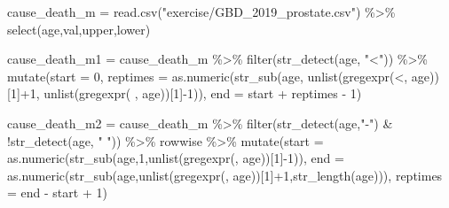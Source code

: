 \documentclass[
  letterpaper,
  DIV=11,
  numbers=noendperiod]{scrartcl}
\newenvironment{Shaded}{\begin{snugshade}}{\end{snugshade}}
\newcommand{\AttributeTok}[1]{\textcolor[rgb]{0.40,0.45,0.13}{#1}}
\newcommand{\DecValTok}[1]{\textcolor[rgb]{0.68,0.00,0.00}{#1}}
\newcommand{\FunctionTok}[1]{\textcolor[rgb]{0.28,0.35,0.67}{#1}}
\newcommand{\NormalTok}[1]{\textcolor[rgb]{0.00,0.23,0.31}{#1}}
\newcommand{\OtherTok}[1]{\textcolor[rgb]{0.00,0.23,0.31}{#1}}
\newcommand{\SpecialCharTok}[1]{\textcolor[rgb]{0.37,0.37,0.37}{#1}}
\newcommand{\StringTok}[1]{\textcolor[rgb]{0.13,0.47,0.30}{#1}}
\begin{document}
\begin{Shaded}
\begin{Highlighting}[]
\NormalTok{cause\_death\_m }\OtherTok{=} \FunctionTok{read.csv}\NormalTok{(}\StringTok{"exercise/GBD\_2019\_prostate.csv"}\NormalTok{) }\SpecialCharTok{\%\textgreater{}\%}
  \FunctionTok{select}\NormalTok{(age,val,upper,lower)}

\NormalTok{cause\_death\_m1 }\OtherTok{=}\NormalTok{ cause\_death\_m }\SpecialCharTok{\%\textgreater{}\%} \FunctionTok{filter}\NormalTok{(}\FunctionTok{str\_detect}\NormalTok{(age, }\StringTok{"\textless{}"}\NormalTok{)) }\SpecialCharTok{\%\textgreater{}\%}
  \FunctionTok{mutate}\NormalTok{(}\AttributeTok{start =} \DecValTok{0}\NormalTok{, }
         \AttributeTok{reptimes =} \FunctionTok{as.numeric}\NormalTok{(}\FunctionTok{str\_sub}\NormalTok{(age,}
                                       \FunctionTok{unlist}\NormalTok{(}\FunctionTok{gregexpr}\NormalTok{(}\StringTok{\textquotesingle{}\textless{}\textquotesingle{}}\NormalTok{, age))[}\DecValTok{1}\NormalTok{]}\SpecialCharTok{+}\DecValTok{1}\NormalTok{,}
                                       \FunctionTok{unlist}\NormalTok{(}\FunctionTok{gregexpr}\NormalTok{(}\StringTok{\textquotesingle{} \textquotesingle{}}\NormalTok{, age))[}\DecValTok{1}\NormalTok{]}\SpecialCharTok{{-}}\DecValTok{1}\NormalTok{)),}
         \AttributeTok{end =}\NormalTok{ start }\SpecialCharTok{+}\NormalTok{ reptimes }\SpecialCharTok{{-}} \DecValTok{1}\NormalTok{)}

\NormalTok{cause\_death\_m2 }\OtherTok{=}\NormalTok{ cause\_death\_m }\SpecialCharTok{\%\textgreater{}\%} 
  \FunctionTok{filter}\NormalTok{(}\FunctionTok{str\_detect}\NormalTok{(age,}\StringTok{"{-}"}\NormalTok{) }\SpecialCharTok{\&} \SpecialCharTok{!}\FunctionTok{str\_detect}\NormalTok{(age, }\StringTok{" "}\NormalTok{)) }\SpecialCharTok{\%\textgreater{}\%}
\NormalTok{  rowwise }\SpecialCharTok{\%\textgreater{}\%}
  \FunctionTok{mutate}\NormalTok{(}\AttributeTok{start =} \FunctionTok{as.numeric}\NormalTok{(}\FunctionTok{str\_sub}\NormalTok{(age,}\DecValTok{1}\NormalTok{,}\FunctionTok{unlist}\NormalTok{(}\FunctionTok{gregexpr}\NormalTok{(}\StringTok{\textquotesingle{}{-}\textquotesingle{}}\NormalTok{, age))[}\DecValTok{1}\NormalTok{]}\SpecialCharTok{{-}}\DecValTok{1}\NormalTok{)),}
         \AttributeTok{end =} \FunctionTok{as.numeric}\NormalTok{(}\FunctionTok{str\_sub}\NormalTok{(age,}\FunctionTok{unlist}\NormalTok{(}\FunctionTok{gregexpr}\NormalTok{(}\StringTok{\textquotesingle{}{-}\textquotesingle{}}\NormalTok{, age))[}\DecValTok{1}\NormalTok{]}\SpecialCharTok{+}\DecValTok{1}\NormalTok{,}\FunctionTok{str\_length}\NormalTok{(age))),}
         \AttributeTok{reptimes =}\NormalTok{ end }\SpecialCharTok{{-}}\NormalTok{ start }\SpecialCharTok{+} \DecValTok{1}\NormalTok{)}


\end{Highlighting}
\end{Shaded}
\end{document}
